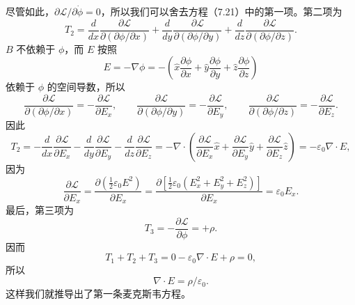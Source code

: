 尽管如此，$\partial\mathcal{L}/\partial\dot{\phi} = 0$，所以我们可以舍去方程（7.21）中的第一项。第二项为
$$
T_2 = \frac{d}{dx}\frac{\partial\mathcal{L}}{\partial(\partial\phi/\partial x)} + \frac{d}{dy}\frac{\partial\mathcal{L}}{\partial(\partial\phi/\partial y)} + \frac{d}{dz}\frac{\partial\mathcal{L}}{\partial(\partial\phi/\partial z)}.
$$
$B$ 不依赖于 $\phi$，而 $E$ 按照
$$
E = -\nabla\phi = -\left(\hat{x}\frac{\partial\phi}{\partial x} + \hat{y}\frac{\partial\phi}{\partial y} + \hat{z}\frac{\partial\phi}{\partial z}\right)
$$
依赖于 $\phi$ 的空间导数，所以
$$
\frac{\partial\mathcal{L}}{\partial(\partial\phi/\partial x)} = -\frac{\partial\mathcal{L}}{\partial E_x}, \qquad
\frac{\partial\mathcal{L}}{\partial(\partial\phi/\partial y)} = -\frac{\partial\mathcal{L}}{\partial E_y}, \qquad
\frac{\partial\mathcal{L}}{\partial(\partial\phi/\partial z)} = -\frac{\partial\mathcal{L}}{\partial E_z}.
$$
因此
$$
T_2 = -\frac{d}{dx}\frac{\partial\mathcal{L}}{\partial E_x} - \frac{d}{dy}\frac{\partial\mathcal{L}}{\partial E_y} - \frac{d}{dz}\frac{\partial\mathcal{L}}{\partial E_z} = -\nabla\cdot\left(\frac{\partial\mathcal{L}}{\partial E_x}\hat{x} + \frac{\partial\mathcal{L}}{\partial E_y}\hat{y} + \frac{\partial\mathcal{L}}{\partial E_z}\hat{z}\right) = -\varepsilon_0\nabla\cdot E,
$$
因为
$$
\frac{\partial\mathcal{L}}{\partial E_x} = \frac{\partial\left(\frac{1}{2}\varepsilon_0E^2\right)}{\partial E_x} = \frac{\partial\left[\frac{1}{2}\varepsilon_0\left(E_x^2 + E_y^2 + E_z^2\right)\right]}{\partial E_x} = \varepsilon_0E_x.
$$
最后，第三项为
$$
T_3 = -\frac{\partial\mathcal{L}}{\partial\phi} = +\rho.
$$
因而
$$
T_1 + T_2 + T_3 = 0 - \varepsilon_0\nabla\cdot E + \rho = 0,
$$
所以
$$
\nabla\cdot E = \rho/\varepsilon_0.
$$
这样我们就推导出了第一条麦克斯韦方程。

